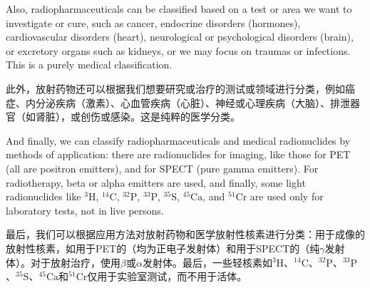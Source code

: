 \documentclass[dvipsnames, svgnames,a4paper,11pt]{article}
\begin{document}
Also, radiopharmaceuticals can be classified based on a test or area we want to investigate or cure, such as cancer, endocrine disorders (hormones), cardiovascular disorders (heart), neurological or psychological disorders (brain), or excretory organs such as kidneys, or we may focus on traumas or infections. This is a purely medical classification.  

此外，放射药物还可以根据我们想要研究或治疗的测试或领域进行分类，例如癌症、内分泌疾病（激素）、心血管疾病（心脏）、神经或心理疾病（大脑）、排泄器官（如肾脏），或创伤或感染。这是纯粹的医学分类。

And finally, we can classify radiopharmaceuticals and medical radionuclides by methods of application: there are radionuclides for imaging, like those for PET (all are positron emitters), and for SPECT (pure gamma emitters). For radiotherapy, beta or alpha emitters are used, and finally, some light radionuclides like \(\mathrm{^{3}H}\), \(\mathrm{^{14}C}\), \(\mathrm{^{32}P}\), \(\mathrm{^{33}P}\), \(\mathrm{^{35}S}\), \(\mathrm{^{45}Ca}\), and \(\mathrm{^{51}Cr}\) are used only for laboratory tests, not in live persons.

最后，我们可以根据应用方法对放射药物和医学放射性核素进行分类：用于成像的放射性核素，如用于PET的（均为正电子发射体）和用于SPECT的（纯$\gamma$发射体）。对于放射治疗，使用$\beta$或$\alpha$发射体。最后，一些轻核素如${}^\text{3}\text{H}$、${}^\text{14}\text{C}$、${}^\text{32}\text{P}$、${}^\text{33}\text{P}$、${}^\text{35}\text{S}$、${}^\text{45}\text{Ca}$和${}^\text{51}\text{Cr}$仅用于实验室测试，而不用于活体。
\end{document}

